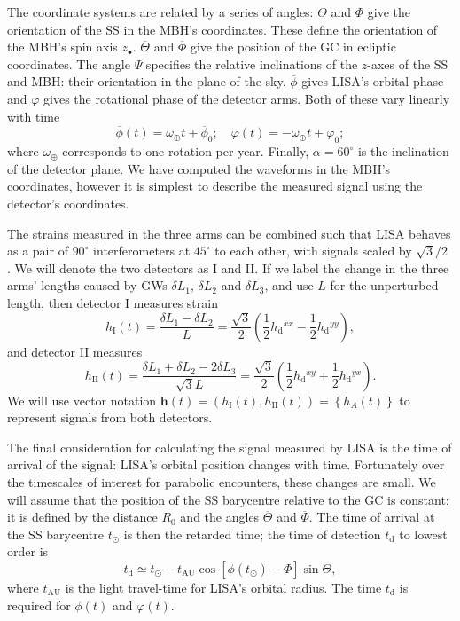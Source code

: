 \documentclass[useAMS,usedcolumn,usegraphicx,usenatbib]{mn2e}
\newcommand{\sub}[1]{\ensuremath{_\mathrm{#1}}}
\newcommand{\recip}[1]{\ensuremath{\frac{1}{#1}}}
\begin{document}
The coordinate systems are related by a series of angles: $\Theta$ and $\Phi$ give the orientation of the SS in the MBH's coordinates. These define the orientation of the MBH's spin axis $z_\bullet$. $\overline{\Theta}$ and $\overline{\Phi}$ give the position of the GC in ecliptic coordinates. The angle $\Psi$ specifies the relative inclinations of the $z$-axes of the SS and MBH: their orientation in the plane of the sky. $\overline{\phi}$ gives LISA's orbital phase and $\varphi$ gives the rotational phase of the detector arms. Both of these vary linearly with time
\begin{equation}
\overline{\phi}(t) = \omega_\oplus t + \overline{\phi}_0; \quad \varphi(t) = -\omega_\oplus t + \varphi_0;
\end{equation}
where $\omega_\oplus$ corresponds to one rotation per year. Finally, $\alpha = 60^{\circ}$ is the inclination of the detector plane. We have computed the waveforms in the MBH's coordinates, however it is simplest to describe the measured signal using the detector's coordinates.

The strains measured in the three arms can be combined such that LISA behaves as a pair of $90^{\circ}$ interferometers at $45^{\circ}$ to each other, with signals scaled by ${\sqrt{3}}/{2}$ \citep{Cutler1998}. We will denote the two detectors as I and II. If we label the change in the three arms' lengths caused by GWs $\delta L_1$, $\delta L_2$ and $\delta L_3$, and use $L$ for the unperturbed length, then detector I measures strain
\begin{equation}
h\sub{I}(t) = \frac{\delta L_1 - \delta L_2}{L} = \frac{\sqrt{3}}{2}\left(\recip{2} h\sub{d}^{xx} - \recip{2}h\sub{d}^{yy}\right),
\end{equation}
and detector II measures
\begin{equation}
h\sub{II}(t) = \frac{\delta L_1 + \delta L_2 - 2 \delta L_3}{\sqrt{3}L} = \frac{\sqrt{3}}{2}\left(\recip{2} h\sub{d}^{xy} + \recip{2} h\sub{d}^{yx}\right).
\end{equation}
We will use vector notation $\boldsymbol{h}(t) = \left(h\sub{I}(t), h\sub{II}(t)\right) = \left\{h_A(t)\right\}$ to represent signals from both detectors.

The final consideration for calculating the signal measured by LISA is the time of arrival of the signal: LISA's orbital position changes with time. Fortunately over the timescales of interest for parabolic encounters, these changes are small. We will assume that the position of the SS barycentre relative to the GC is constant: it is defined by the distance $R_0$ and the angles $\overline{\Theta}$ and $\overline{\Phi}$. The time of arrival at the SS barycentre $t_\odot$ is then the retarded time; the time of detection $t\sub{d}$ to lowest order is
\begin{equation}
t\sub{d} \simeq t_\odot - t\sub{AU}\cos\left[\overline{\phi}(t_\odot) - \overline{\Phi}\right]\sin\overline{\Theta},
\end{equation}
where $t\sub{AU}$ is the light travel-time for LISA's orbital radius. The time $t\sub{d}$ is required for $\phi(t)$ and $\varphi(t)$.
\end{document}
